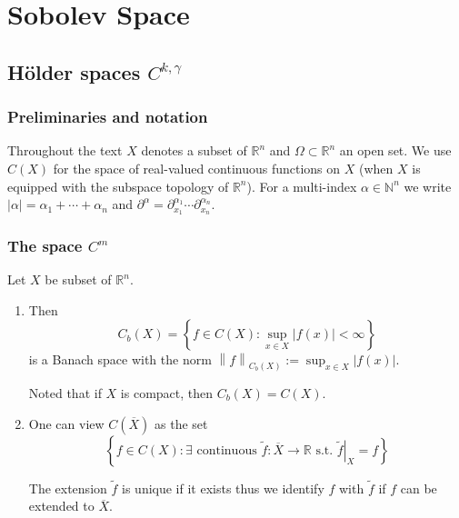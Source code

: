 \chapter{Sobolev Space}

\section{Hölder spaces $C^{k,\gamma}$}


\subsection{Preliminaries and notation}
Throughout the text $X$ denotes a subset of $\mathbb{R}^n$ and $\Omega\subset\mathbb{R}^n$ an open set.
We use $C(X)$ for the space of real-valued continuous functions on $X$ (when $X$ is equipped with the subspace topology of $\mathbb{R}^n$).
For a multi-index $\alpha\in\mathbb{N}^n$ we write $\left|\alpha\right|=\alpha_1+\cdots+\alpha_n$ and
\(\partial^\alpha = \partial^{\alpha_1}_{x_1}\cdots\partial^{\alpha_n}_{x_n}.\)

\subsection{The space $C^m$}
\begin{lemma}
    Let $X$ be subset of $\mathbb{R}^n$.
    \begin{enumerate}
        \item
              Then
              \begin{equation*}
                  C_b\left(X\right)
                  =
                  \left\{f \in C\left(X\right):
                  \sup_{x \in X} \left|f(x)\right| < \infty \right\}
              \end{equation*}
              is a Banach space with the norm $\left\|f\right\|_{C_b(X)} := \sup_{x \in X} \left|f(x)\right|$.
              \begin{remark}
                  Noted that if $X$ is compact, then $C_b\left(X\right)=C\left(X\right)$.
              \end{remark}
        \item
              One can view $C\left(\overline{X}\right)$ as the set
              \begin{equation*}
                  \left\{f \in C\left(X\right): \exists \text{ continuous } \tilde{f} : \overline{X} \rightarrow \mathbb{R} \text{ s.t. } \left.\tilde{f}\right|_{X} = f
                  \right\}
              \end{equation*}
              \begin{remark}
                  The extension $\tilde{f}$ is unique if it exists thus we identify $f$ with $\tilde{f}$ if $f$ can be extended to $\overline{X}$.
              \end{remark}
    \end{enumerate}
\end{lemma}


